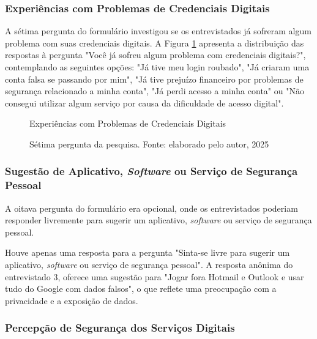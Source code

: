 \documentclass[12pt]{article}
\begin{document}
\subsubsection{Experiências com Problemas de Credenciais Digitais}

A sétima pergunta do formulário investigou se os entrevistados já sofreram algum
problema com suas credenciais digitais.
A Figura \ref{fig:resposta_7} apresenta a distribuição das respostas à pergunta
"Você já sofreu algum problema com credenciais digitais?", contemplando as
seguintes opções: "Já tive meu login roubado", "Já criaram uma conta falsa se
passando por mim", "Já tive prejuízo financeiro por problemas de segurança
relacionado a minha conta", "Já perdi acesso a minha conta" ou "Não consegui
utilizar algum serviço por causa da dificuldade de acesso digital".

\begin{figure}[!htbp]
  \centering
  \caption*{\normalfont\normalsize Experiências com Problemas de Credenciais Digitais}
  \caption{Sétima pergunta da pesquisa. Fonte: elaborado pelo autor, 2025}
  \label{fig:resposta_7}
\end{figure}
\FloatBarrier

\subsubsection{Sugestão de Aplicativo, \textit{Software} ou Serviço de Segurança Pessoal}

A oitava pergunta do formulário era opcional, onde os entrevistados poderiam responder
livremente para sugerir um aplicativo, \textit{software} ou serviço de segurança pessoal.

Houve apenas uma resposta para a pergunta "Sinta-se livre para sugerir um aplicativo,
\textit{software} ou serviço de segurança pessoal".
A resposta anônima do entrevistado 3, oferece uma sugestão para "Jogar fora Hotmail
e Outlook e usar tudo do Google com dados falsos", o que reflete uma preocupação com a
privacidade e a exposição de dados.

\subsubsection{Percepção de Segurança dos Serviços Digitais}
\end{document}
